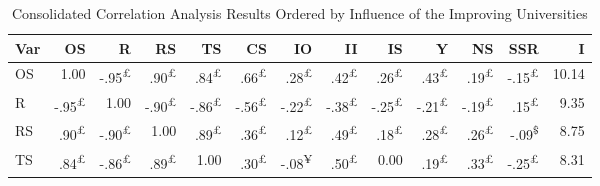 \documentclass{singlecol-new}
\theoremstyle{TH}{
\newtheorem{lemma}{Lemma}
\newtheorem{theorem}[lemma]{Theorem}
\newtheorem{corrolary}[lemma]{Corrolary}
\newtheorem{conjecture}[lemma]{Conjecture}
\newtheorem{proposition}[lemma]{Proposition}
\newtheorem{claim}[lemma]{Claim}
\newtheorem{stheorem}[lemma]{Wrong Theorem}
\newtheorem{algorithm}{Algorithm}
}
\theoremstyle{THrm}{
\newtheorem{definition}{Definition}[section]
\newtheorem{question}{Question}[section]
\newtheorem{remark}{Remark}
\newtheorem{scheme}{Scheme}
}
\theoremstyle{THhit}{
\newtheorem{case}{Case}[section]
}
\begin{document}
\begin{table*}[h!]
	\centering
	\caption{Consolidated Correlation Analysis Results Ordered by Influence of the Improving Universities}
	\label{tab:correlation_improving}
	\scriptsize
	\begin{tabular}{lrrrrrrrrrrrr}
		\hline
		\textbf{Var} & \textbf{OS} & \textbf{R} & \textbf{RS} & \textbf{TS} & \textbf{CS} & \textbf{IO} & \textbf{II} & \textbf{IS} & \textbf{Y} & \textbf{NS} & \textbf{SSR} & \textbf{I} \\ \hline
		
		OS & \cellcolor{gray!50}1.00 & \cellcolor{gray!48}-.95\textsuperscript{£} & \cellcolor{gray!45}.90\textsuperscript{£} & \cellcolor{gray!42}.84\textsuperscript{£} & \cellcolor{gray!33}.66\textsuperscript{£} & \cellcolor{gray!14}.28\textsuperscript{£} & \cellcolor{gray!21}.42\textsuperscript{£} & \cellcolor{gray!13}.26\textsuperscript{£} & \cellcolor{gray!22}.43\textsuperscript{£} & \cellcolor{gray!09}.19\textsuperscript{£} & \cellcolor{gray!07}-.15\textsuperscript{£} & 10.14 \\
		R & \cellcolor{gray!48}-.95\textsuperscript{£} & \cellcolor{gray!50}1.00 & \cellcolor{gray!45}-.90\textsuperscript{£} & \cellcolor{gray!43}-.86\textsuperscript{£} & \cellcolor{gray!28}-.56\textsuperscript{£} & \cellcolor{gray!11}-.22\textsuperscript{£} & \cellcolor{gray!19}-.38\textsuperscript{£} & \cellcolor{gray!13}-.25\textsuperscript{£} & \cellcolor{gray!10}-.21\textsuperscript{£} & \cellcolor{gray!09}-.19\textsuperscript{£} & \cellcolor{gray!07}.15\textsuperscript{£} & 9.35 \\
		RS & \cellcolor{gray!45}.90\textsuperscript{£} & \cellcolor{gray!45}-.90\textsuperscript{£} & \cellcolor{gray!50}1.00 & \cellcolor{gray!45}.89\textsuperscript{£} & \cellcolor{gray!18}.36\textsuperscript{£} & \cellcolor{gray!06}.12\textsuperscript{£} & \cellcolor{gray!24}.49\textsuperscript{£} & \cellcolor{gray!09}.18\textsuperscript{£} & \cellcolor{gray!14}.28\textsuperscript{£} & \cellcolor{gray!13}.26\textsuperscript{£} & \cellcolor{gray!05}-.09\textsuperscript{\$} & 8.75 \\
		TS & \cellcolor{gray!42}.84\textsuperscript{£} & \cellcolor{gray!43}-.86\textsuperscript{£} & \cellcolor{gray!45}.89\textsuperscript{£} & \cellcolor{gray!50}1.00 & \cellcolor{gray!15}.30\textsuperscript{£} & \cellcolor{gray!04}-.08\textsuperscript{¥} & \cellcolor{gray!25}.50\textsuperscript{£} & 0.00 & \cellcolor{gray!09}.19\textsuperscript{£} & \cellcolor{gray!17}.33\textsuperscript{£} & \cellcolor{gray!13}-.25\textsuperscript{£} & 8.31 \\

\end{tabular}
\end{table*}
\end{document}
